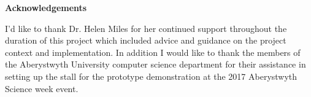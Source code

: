 \thispagestyle{empty}

\begin{center}
    {\LARGE\bf Acknowledgements}
\end{center}

I'd like to thank Dr. Helen Miles for her continued support throughout the duration of this project which included advice and guidance on the project context and implementation. In addition I would like to thank the members of the Aberystwyth University computer science department for their assistance in setting up the stall for the prototype demonstration at the 2017 Aberystwyth Science week event.

